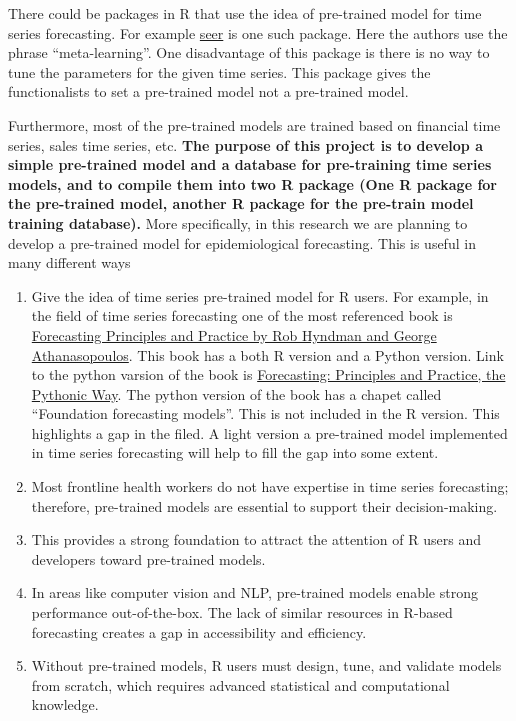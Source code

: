 \documentclass[
]{article}
\begin{document}
There could be packages in R that use the idea of pre-trained model for
time series forecasting. For example
\href{https://cran.r-project.org/web/packages/seer/index.html}{seer} is
one such package. Here the authors use the phrase ``meta-learning''. One
disadvantage of this package is there is no way to tune the parameters
for the given time series. This package gives the functionalists to set
a pre-trained model not a pre-trained model.

Furthermore, most of the pre-trained models are trained based on
financial time series, sales time series, etc. \textbf{The purpose of
this project is to develop a simple pre-trained model and a database for
pre-training time series models, and to compile them into two R package
(One R package for the pre-trained model, another R package for the
pre-train model training database).} More specifically, in this research
we are planning to develop a pre-trained model for epidemiological
forecasting. This is useful in many different ways

\begin{enumerate}
\def\labelenumi{\arabic{enumi}.}
\item
  Give the idea of time series pre-trained model for R users. For
  example, in the field of time series forecasting one of the most
  referenced book is \href{https://otexts.com/fpp3/}{Forecasting
  Principles and Practice by Rob Hyndman and George Athanasopoulos}.
  This book has a both R version and a Python version. Link to the
  python varsion of the book is
  \href{https://otexts.com/fpppy/}{Forecasting: Principles and Practice,
  the Pythonic Way}. The python version of the book has a chapet called
  ``Foundation forecasting models''. This is not included in the R
  version. This highlights a gap in the filed. A light version a
  pre-trained model implemented in time series forecasting will help to
  fill the gap into some extent.
\item
  Most frontline health workers do not have expertise in time series
  forecasting; therefore, pre-trained models are essential to support
  their decision-making.
\item
  This provides a strong foundation to attract the attention of R users
  and developers toward pre-trained models.
\item
  In areas like computer vision and NLP, pre-trained models enable
  strong performance out-of-the-box. The lack of similar resources in
  R-based forecasting creates a gap in accessibility and efficiency.
\item
  Without pre-trained models, R users must design, tune, and validate
  models from scratch, which requires advanced statistical and
  computational knowledge.
\end{enumerate}
\end{document}
